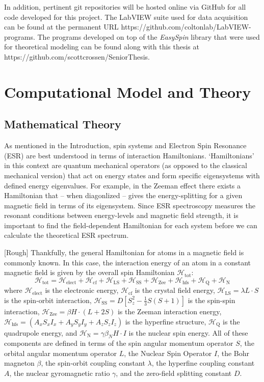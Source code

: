 \documentclass[oneside, astronomy, noacknowlegments]{BYUPhys}
\begin{document}
In addition, pertinent git repositories will be hosted online via GitHub for all code developed for this project. The LabVIEW suite used for data acquisition can be found at the permanent URL https://github.com/coltonlab/LabVIEW-programs. The programs developed on top of the \textit{EasySpin} library that were used for theoretical modeling can be found along with this thesis at https://github.com/scottcrossen/SeniorThesis.










\chapter{Computational Model and Theory}

\section{Mathematical Theory}

As mentioned in the Introduction, spin systems and Electron Spin Resonance (ESR) are best understood in terms of interaction Hamiltonians. `Hamiltonians' in this context are quantum mechanical operators (as opposed to the classical mechanical version) that act on energy states and form specific eigensystems with defined energy eigenvalues. For example, in the Zeeman effect there exists a Hamiltonian that -- when diagonlized -- gives the energy-splitting for a given magnetic field in terms of its eigensystem. Since ESR spectroscopy measures the resonant conditions between energy-levels and magnetic field strength, it is important to find the field-dependent Hamiltonian for each system before we can calculate the theoretical ESR spectrum.

[Rough] Thankfully, the general Hamiltonian for atoms in a magnetic field is commonly known. In this case, the interaction energy of an atom in a constant magnetic field is given by the overall spin Hamiltonian $\mathcal{H}_{\text{tot}}$: $$\mathcal{H}_{\text{tot}} = \mathcal{H}_{\text{elect}} + \mathcal{H}_{\text{cf}} + \mathcal{H}_{\text{LS}} + \mathcal{H}_{\text{SS}} + \mathcal{H}_{\text{Zee}} + \mathcal{H}_{\text{hfs}} + \mathcal{H}_{\text{Q}} + \mathcal{H}_{\text{N}}$$ where $\mathcal{H}_{\text{elect}}$ is the electronic energy, $\mathcal{H}_{\text{cf}}$ is the crystal field energy, $\mathcal{H}_{\text{LS}} = \lambda L \cdot S$ is the spin-orbit interaction, $\mathcal{H}_{\text{SS}} = D \left[ S_{z}^{2} - \frac{1}{3} S (S+1) \right]$ is the spin-spin interaction, $\mathcal{H}_{\text{Zee}} = \beta H \cdot (L+2S)$ is the Zeeman interaction energy, $\mathcal{H}_{\text{hfs}} = \left(A_xS_xI_x + A_yS_yI_y + A_zS_zI_z\right)$ is the hyperfine structure, $\mathcal{H}_{\text{Q}}$ is the quadrupole energy, and $\mathcal{H}_{\text{N}} = \gamma \beta_{N} H \cdot I$ is the nuclear spin energy. All of these components are defined in terms of the spin angular momentum operator $S$, the orbital angular momentum operator $L$, the Nuclear Spin Operator $I$, the Bohr magneton $\beta$, the spin-orbit coupling constant $\lambda$, the hyperfine coupling constant $A$, the nuclear gyromagnetic ratio $\gamma$, and the zero-field splitting constant $D$.
\end{document}
